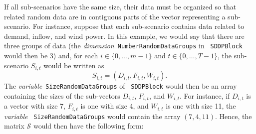 \documentclass[a4paper]{article}
\def\dimension{\textit{dimension}\xspace}
\def\variable{\textit{variable}\xspace}
\newcommand{\code}[1]{\textrm{\texttt{\hyphenchar\font=200 #1}}}
\newcommand{\cstr}[1]{\code{#1}}
\begin{document}
If all sub-scenarios have the same size, their data must be organized so that
related random data are in contiguous parts of the vector representing a
sub-scenario. For instance, suppose that each sub-scenario contains data
related to demand, inflow, and wind power. In this example, we would say that
there are three groups of data (the \dimension \cstr{NumberRandomDataGroups}
in \code{SDDPBlock} would then be 3) and, for each $i \in \{ 0, \dots, m-1 \}$
and $t \in \{0, \dots, T-1\}$, the sub-scenario $S_{i,t}$ would be written as
\[
S_{i,t} = \left( D_{i,t} , F_{i,t} , W_{i,t} \right).
\]
The \variable \cstr{SizeRandomDataGroups} of \code{SDDPBlock} would then be an
array containing the sizes of the sub-vectors $D_{i,t}$, $F_{i,t}$, and
$W_{i,t}$. For instance, if $D_{i,t}$ is a vector with size 7, $F_{i,t}$ is
one with size 4, and $W_{i,t}$ is one with size 11, the \variable
\cstr{SizeRandomDataGroups} would contain the array $(7, 4, 11)$. Hence, the
matrix $\mathcal{S}$ would then have the following form:
\end{document}

